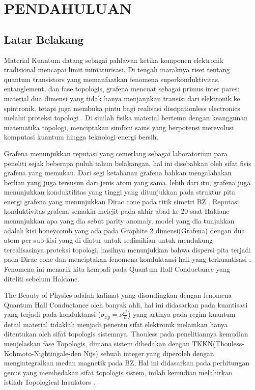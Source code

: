 \setcounter{page}{1}
\chapter{PENDAHULUAN}

\RaggedRight\section{Latar Belakang}
\justifying
Material Kuantum datang sebagai pahlawan ketika komponen elektronik tradisional mencapai limit miniaturisasi. Di tengah maraknya riset tentang quantum transistors yang memanfaatkan fenomena superkonduktivitas, entanglement, dan fase topologis\parencite{Chang2015}, grafena mencuat sebagai primus inter pares: material dua dimensi yang tidak hanya menjanjikan transisi dari elektronik ke spintronik, tetapi juga membuka pintu bagi realisasi dissipationless electronics melalui proteksi topologi  \parencite{PhysRevLett.95.226801}. Di sinilah fisika material bertemu dengan keanggunan matematika topologi, menciptakan simfoni sains yang berpotensi merevolusi komputasi kuantum hingga teknologi energi bersih\parencite{Nadeem2021}.
\par
Grafena menunjukkan reputasi yang cemerlang sebagai laboratorium para peneliti sejak beberapa puluh tahun belakangan, hal ini disebabkan oleh sifat fisis grafena yang memukau. Dari segi ketahanan grafena bahkan mengalahakan berlian yang juga tersusun dari jenis atom yang sama. lebih dari itu, grafena juga menunjukkan konduktifitas yang tinggi yang ditunjukkan pada struktur pita energi grafena yang menunjukkan Dirac cone pada titik simetri BZ \parencite{PhysRev.71.622}\parencite{PhysRevB.1.4747}. Reputasi konduktivitas grafena semakin melejit pada akhir abad ke 20 saat Haldane menunjukkan apa yang dia sebut parity anomaly, model yang dia tunjukkan adalah kisi honeycomb yang ada pada Graphite 2 dimensi(Grafena) dengan dua atom per sub-kisi yang di diatur untuk sedimikian untuk mendukung terealisasinya proteksi topologi, hasilnya menunjukkan bahwa dispersi pita terjadi pada Dirac cone dan menciptakan fenomena konduktansi hall yang terkuantisasi \parencite{PhysRevLett.61.2015}. Fenomena ini menarik kita kembali pada Quantum Hall Conductance yang diteliti sebelum Haldane.
\par
    The Beauty of Physics adalah kalimat yang disandingkan dengan fenomena Quantum Hall Conductance oleh banyak ahli, hal ini didasarkan pada kuantisasi yang terjadi pada konduktansi ($\sigma_{xy}=\nu \frac{e^2}{\hbar}$) yang artinya pada regim kuantum detail material tidaklah menjadi penentu sifat elektronik melainkan hanya ditentukan oleh sifat topologis sistemnya\parencite{PhysRevLett.45.494}. Thouless pada penelitiannya kemudian menjelaskan fase Topologis, dimana sistem dibedakan dengan TKKN(Thouless-Kohmoto-Nightingale-den Nijs) sebuah integer yang diperoleh dengan mengintegralkan medan magnetik pada BZ, Hal ini didasarkan pada perhitungan genus yang membedakan sifat topologis sistem, inilah kemudian melahirkan istilah Topological Insulators \parencite{PhysRevLett.49.405}. 
